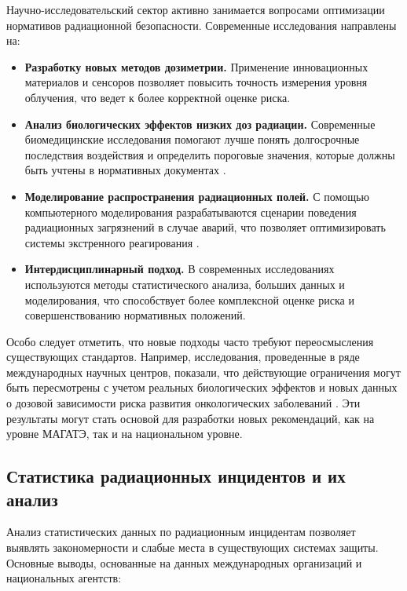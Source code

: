\documentclass[a4paper, 14pt]{extarticle}
\begin{document}
Научно-исследовательский сектор активно занимается вопросами оптимизации нормативов радиационной безопасности. Современные исследования направлены на:

\begin{itemize}
    \item \textbf{Разработку новых методов дозиметрии.} Применение инновационных материалов и сенсоров позволяет повысить точность измерения уровня облучения, что ведет к более корректной оценке риска.

    \item \textbf{Анализ биологических эффектов низких доз радиации.} Современные биомедицинские исследования помогают лучше понять долгосрочные последствия воздействия и определить пороговые значения, которые должны быть учтены в нормативных документах \cite{16}.

    \item \textbf{Моделирование распространения радиационных полей.} С помощью компьютерного моделирования разрабатываются сценарии поведения радиационных загрязнений в случае аварий, что позволяет оптимизировать системы экстренного реагирования \cite{3}.

    \item \textbf{Интердисциплинарный подход.} В современных исследованиях используются методы статистического анализа, больших данных и моделирования, что способствует более комплексной оценке риска и совершенствованию нормативных положений.
\end{itemize}

Особо следует отметить, что новые подходы часто требуют переосмысления существующих стандартов. Например, исследования, проведенные в ряде международных научных центров, показали, что действующие ограничения могут быть пересмотрены с учетом реальных биологических эффектов и новых данных о дозовой зависимости риска развития онкологических заболеваний \cite{16}. Эти результаты могут стать основой для разработки новых рекомендаций, как на уровне МАГАТЭ, так и на национальном уровне.

\subsection{Статистика радиационных инцидентов и их анализ}

Анализ статистических данных по радиационным инцидентам позволяет выявлять закономерности и слабые места в существующих системах защиты. Основные выводы, основанные на данных международных организаций и национальных агентств:
\end{document}
